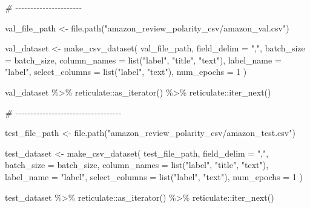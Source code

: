 \documentclass[
]{article}
\newenvironment{Shaded}{}{}
\newcommand{\AttributeTok}[1]{\textcolor[rgb]{0.49,0.56,0.16}{#1}}
\newcommand{\CommentTok}[1]{\textcolor[rgb]{0.38,0.63,0.69}{\textit{#1}}}
\newcommand{\DecValTok}[1]{\textcolor[rgb]{0.25,0.63,0.44}{#1}}
\newcommand{\FunctionTok}[1]{\textcolor[rgb]{0.02,0.16,0.49}{#1}}
\newcommand{\NormalTok}[1]{#1}
\newcommand{\OtherTok}[1]{\textcolor[rgb]{0.00,0.44,0.13}{#1}}
\newcommand{\SpecialCharTok}[1]{\textcolor[rgb]{0.25,0.44,0.63}{#1}}
\newcommand{\StringTok}[1]{\textcolor[rgb]{0.25,0.44,0.63}{#1}}
\begin{document}
\begin{Shaded}
\begin{Highlighting}[]
\CommentTok{\# {-}{-}{-}{-}{-}{-}{-}{-}{-}{-}{-}{-}{-}{-}{-}{-}{-}{-}{-}{-}{-}{-}}

\NormalTok{val\_file\_path }\OtherTok{\textless{}{-}} \FunctionTok{file.path}\NormalTok{(}\StringTok{"amazon\_review\_polarity\_csv/amazon\_val.csv"}\NormalTok{)}

\NormalTok{val\_dataset }\OtherTok{\textless{}{-}} \FunctionTok{make\_csv\_dataset}\NormalTok{(}
\NormalTok{  val\_file\_path, }
  \AttributeTok{field\_delim =} \StringTok{","}\NormalTok{,}
  \AttributeTok{batch\_size =}\NormalTok{ batch\_size,}
  \AttributeTok{column\_names =} \FunctionTok{list}\NormalTok{(}\StringTok{"label"}\NormalTok{, }\StringTok{"title"}\NormalTok{, }\StringTok{"text"}\NormalTok{),}
  \AttributeTok{label\_name =} \StringTok{"label"}\NormalTok{,}
  \AttributeTok{select\_columns =} \FunctionTok{list}\NormalTok{(}\StringTok{"label"}\NormalTok{, }\StringTok{"text"}\NormalTok{),}
  \AttributeTok{num\_epochs =} \DecValTok{1}
\NormalTok{)}


\NormalTok{val\_dataset }\SpecialCharTok{\%\textgreater{}\%}
\NormalTok{  reticulate}\SpecialCharTok{::}\FunctionTok{as\_iterator}\NormalTok{() }\SpecialCharTok{\%\textgreater{}\%} 
\NormalTok{  reticulate}\SpecialCharTok{::}\FunctionTok{iter\_next}\NormalTok{()}

\CommentTok{\# {-}{-}{-}{-}{-}{-}{-}{-}{-}{-}{-}{-}{-}{-}{-}{-}{-}{-}{-}{-}{-}{-}{-}{-}{-}{-}{-}{-}{-}{-}{-}{-}{-}{-}{-}}

\NormalTok{test\_file\_path }\OtherTok{\textless{}{-}} \FunctionTok{file.path}\NormalTok{(}\StringTok{"amazon\_review\_polarity\_csv/amazon\_test.csv"}\NormalTok{)}


\NormalTok{test\_dataset }\OtherTok{\textless{}{-}} \FunctionTok{make\_csv\_dataset}\NormalTok{(}
\NormalTok{  test\_file\_path, }
  \AttributeTok{field\_delim =} \StringTok{","}\NormalTok{,}
  \AttributeTok{batch\_size =}\NormalTok{ batch\_size,}
  \AttributeTok{column\_names =} \FunctionTok{list}\NormalTok{(}\StringTok{"label"}\NormalTok{, }\StringTok{"title"}\NormalTok{, }\StringTok{"text"}\NormalTok{),}
  \AttributeTok{label\_name =} \StringTok{"label"}\NormalTok{,}
  \AttributeTok{select\_columns =} \FunctionTok{list}\NormalTok{(}\StringTok{"label"}\NormalTok{, }\StringTok{"text"}\NormalTok{),}
  \AttributeTok{num\_epochs =} \DecValTok{1}
\NormalTok{)}

\NormalTok{test\_dataset }\SpecialCharTok{\%\textgreater{}\%}
\NormalTok{  reticulate}\SpecialCharTok{::}\FunctionTok{as\_iterator}\NormalTok{() }\SpecialCharTok{\%\textgreater{}\%} 
\NormalTok{  reticulate}\SpecialCharTok{::}\FunctionTok{iter\_next}\NormalTok{()}


\end{Highlighting}
\end{Shaded}
\end{document}
